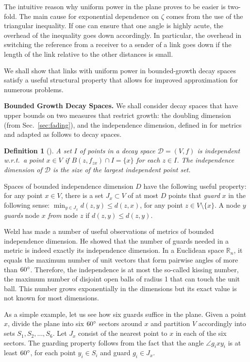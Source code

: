 \documentclass[11pt]{amsart}
\newtheorem{definition}{Definition}[section]
\def\calD{{\mathcal{D}}}
\newcommand{\mypara}[1]{\smallskip\noindent\textbf{#1.}}  \newcommand{\tightpara}[1]{\noindent\textbf{#1.}}  \newcommand{\inddim}{D}
\begin{document}
The intuitive reason why uniform power in the plane proves to be easier
is two-fold.  The main cause for exponential dependence on $\zeta$
comes from the use of the triangular inequality. If one can ensure
that one angle is highly acute, the overhead of the inequality goes
down accordingly. In particular, the overhead in switching the
reference from a receiver to a sender of a link goes down if the
length of the link relative to the other distances is small.

We shall show that links with uniform power in bounded-growth decay spaces
satisfy a useful structural property that allows for improved
approximation for numerous problems.

\mypara{Bounded Growth Decay Spaces}
We shall consider decay spaces that have upper bounds on two measures
that restrict growth: 
the doubling dimension (from Sec.~\ref{sec:fading}), 
and the independence dimension, defined in \cite{GHWW09} for metrics
and adapted as follows to decay spaces.


\begin{definition}[\cite{GHWW09}]
A set $I$ of points in a decay space $\calD=(V,f)$ is \emph{independent} w.r.t.\ a point $x \in V$ if $B(z, f_{zx})\cap I = \{ x \}$ for each $z \in I$.
The \emph{independence dimension} of $\calD$ is the size of the largest independent point set.
\end{definition}

Spaces of bounded independence dimension $\inddim$ have the following
useful property: for any point $x \in V$, there is a set $J_x \subset
V$ of at most $\inddim$ points that \emph{guard} $x$ in the following
sense: $\min_{y \in J_x} d(z,y) \le d(z,x)$, for any point $z \in V \setminus \{x\}$. A node $y$ \emph{guards} node $x$ \emph{from} node $z$ if
$d(z,y) \le d(z,y)$.

Welzl \cite{Welzl08} has made a number of useful observations of
metrics of bounded independence dimension. He showed that the number of guards needed in a
metric is indeed exactly its independence dimension. In a Euclidean
space $\mathbb{R}_n$, it equals the maximum number of unit vectors
that form pairwise angles of more than $60^\circ$.
Therefore, the independence is at most the so-called kissing number,
the maximum number of disjoint open balls of radius 1 that can touch
the unit ball. This number grows exponentially in the dimensions but
its exact value is not known for most dimensions.

As a simple example, let us see how six guards suffice in the plane.
Given a point $x$, divide the plane into six $60^\circ$ sectors around $x$
and partition $V$ accordingly into sets $S_1, S_2, \ldots, S_6$.
Let $J_x$ consist of the nearest point to $x$ in each of the six sectors.
The guarding property follows from the fact that the angle $\angle g_i x y_i$ is at least $60^\circ$, for each point $y_i \in S_i$ and guard $g_i \in J_x$.
\end{document}
